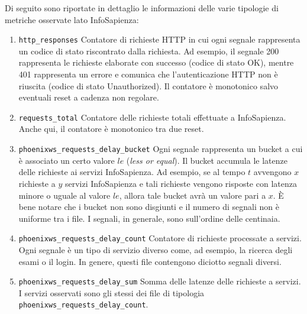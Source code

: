     Di seguito sono riportate in dettaglio le informazioni delle varie tipologie di metriche osservate lato 
    InfoSapienza:
    \begin{enumerate}[leftmargin=14pt]
        \item \texttt{http\_responses}  Contatore di richieste HTTP in cui ogni segnale rappresenta un codice di stato 
                                            riscontrato dalla richiesta. 
                                            Ad esempio, il segnale 200 rappresenta le richieste elaborate con 
                                            successo (codice di stato OK), mentre 401 rappresenta un errore e 
                                            comunica che l'autenticazione HTTP non è riuscita (codice di stato 
                                            Unauthorized). Il contatore è monotonico salvo eventuali reset 
                                            a cadenza non regolare.
        \item \texttt{requests\_total}  Contatore delle richieste totali effettuate a InfoSapienza. Anche qui, il contatore 
                                            è monotonico tra due reset.
        \item \texttt{phoenixws\_requests\_delay\_bucket} 
                                            Ogni segnale rappresenta un bucket a cui è associato un certo valore $le$ (\emph{less or equal}).
                                            Il bucket accumula le latenze delle richieste ai servizi InfoSapienza. 
                                            Ad esempio, se al tempo $t$ avvengono $x$ richieste a $y$ servizi InfoSapienza
                                            e tali richieste vengono risposte con latenza minore o uguale al valore $le$, 
                                            allora tale bucket avrà un valore pari a $x$. È bene 
                                            notare che i bucket non sono disgiunti e il numero di segnali non è uniforme 
                                            tra i file. I segnali, in generale, sono sull'ordine delle centinaia.
        \item \texttt{phoenixws\_requests\_delay\_count}
                                            Contatore di richieste processate a servizi. Ogni segnale è un tipo di servizio
                                            diverso come, ad esempio, la ricerca degli esami o il login. In genere, questi file 
                                            contengono diciotto segnali diversi.
        \item \texttt{phoenixws\_requests\_delay\_sum}
                                            Somma delle latenze delle richieste a servizi. I servizi osservati sono gli 
                                            stessi dei file di tipologia \texttt{phoenixws\_requests\_delay\_count}.                                
    \end{enumerate}

